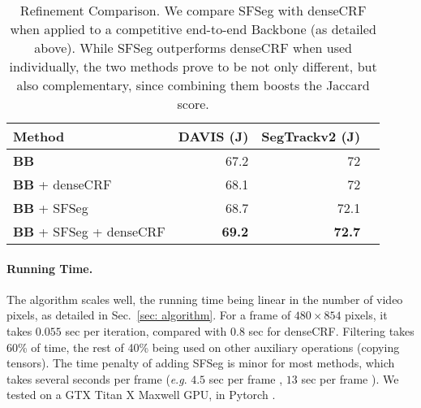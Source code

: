\documentclass{article}
\newcommand{\eg}{\textit{e}.\textit{g}. }
\begin{document}
\begin{table}[t]
\begin{center}
	\begin{tabular}{l r r r}
		\toprule
		\multicolumn{1}{l}{Method} &
		\multicolumn{1}{p{1cm}}{\raggedleft DAVIS (J)} &
		\multicolumn{1}{p{2.1cm}}{\raggedleft SegTrackv2 (J)} \\
        \midrule
		\textbf{BB} & 67.2 & 72\\
		\textbf{BB} + denseCRF & 68.1 & 72\\
\textbf{BB} + SFSeg& 68.7 & 72.1 \\
		\textbf{BB} + SFSeg + denseCRF & \textbf{69.2} & \textbf{72.7} \\
		\bottomrule
    \end{tabular}
\end{center}
\caption{Refinement Comparison. We compare SFSeg with denseCRF when applied to a competitive end-to-end Backbone (as detailed above). While SFSeg outperforms denseCRF when used individually, the two methods prove to be not only different, but also complementary, since combining them boosts the Jaccard score.}
\label{tab:backbone}
\vspace{-1em}
\end{table}

\paragraph{Running Time.} The algorithm scales well, the running time being linear in the number of video pixels, as detailed in Sec.~\ref{sec: algorithm}. For a frame of $480\times854$ pixels, it takes $0.055$ sec per iteration, compared with $0.8$ sec for denseCRF. Filtering takes 60\% of time, the rest of 40\% being used on other auxiliary operations (copying tensors). The time penalty of adding SFSeg is minor for most methods, which takes several seconds per frame (\eg $4.5$ sec per frame \cite{osvoss}, $13$ sec per frame \cite{premvos}). We tested on a GTX Titan X Maxwell GPU, in Pytorch \cite{pytorch}.
\end{document}
